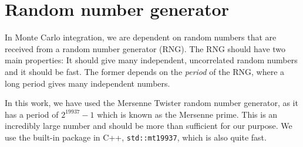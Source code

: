 \section{Random number generator}
In Monte Carlo integration, we are dependent on random numbers that are received from a random number generator (RNG). The RNG should have two main properties: It should give many independent, uncorrelated random numbers and it should be fast. The former depends on the \textit{period} of the RNG, where a long period gives many independent numbers. 

In this work, we have used the Mersenne Twister random number generator, as it has a period of $2^{19937}-1$ which is known as the Mersenne prime. This is an incredibly large number and should be more than sufficient for our purpose. We use the built-in package in C++, \lstinline|std::mt19937|, which is also quite fast.